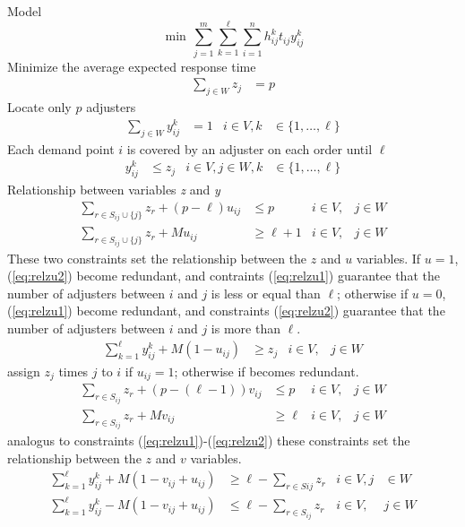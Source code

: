 Model
\begin{equation}
  \min \, \sum_{j=1}^{m}{
    \sum_{k=1}^{\ell}{
      \sum_{i=1}^{n}{
        h_{ij}^{k}t_{ij}y_{ij}^{k}
      }
    }
  }
\end{equation}
Minimize the average expected response time
\begin{align}
  \sum_{j \in W}{z_j}
  & = p
\end{align}
Locate only $p$ adjusters
\begin{align}
  \sum_{j \in W}{y_{ij}^{k}}
  & = 1
  & i \in V, k
  &\in \{1,\ldots,\ell\}
\end{align}
Each demand point $i$ is covered by an adjuster on each order until $\ell$
\begin{align}
  y_{ij}^{k}
  & \leq z_j
  & i \in V,j \in W, k
  &\in \{1,\ldots,\ell\}
\end{align}
Relationship between variables \textit{z} and \textit{y}
\begin{align}
  \label{eq:relzu1}
  \sum_{r \in S_{ij}\cup\{j\}}{
    z_{r}
  }
  + (p-\ell) u_{ij}
  & \leq p
  & i \in V,
  & j \in W 
  \\
  \label{eq:relzu2}
  \sum_{r \in S_{ij}\cup\{j\}}{
    z_{r}
  }
  + M u_{ij}
  & \geq \ell+1
  & i \in V,
  & j \in W
\end{align}
These two constraints
set the relationship
between the $z$ and $u$ variables.
If $u = 1$,
(\ref{eq:relzu2}) become redundant,
and contraints (\ref{eq:relzu1}) guarantee
that the number of adjusters between $i$ and $j$
is less or equal than $\ell$;
otherwise
if $u = 0$,
(\ref{eq:relzu1}) become redundant,
and constraints (\ref{eq:relzu2}) guarantee
that the number of adjusters between $i$ and $j$
is more than $\ell$.
\begin{align}
  \sum_{k = 1}^{\ell}{
    y_{ij}^{k}
  }
  + M (1 - u_{ij})
  & \geq z_j
  & i \in V,
  & j \in W
\end{align}
assign $z_j$ times $j$ to $i$ if $u_{ij}=1$;
otherwise
if becomes redundant.
\begin{align}
  \sum_{r \in S_{ij}}{
    z_{r}
  }
  + (p-(\ell-1)) v_{ij}
  & \leq p
  & i \in V,
  & j \in W
  \\
  \sum_{r \in S_{ij}}{
    z_{r}
  }
  + M v_{ij}
  & \geq \ell
  & i \in V,
  & j \in W
\end{align}
analogus to constraints (\ref{eq:relzu1})-(\ref{eq:relzu2})
these constraints
set the relationship
between the $z$ and $v$ variables.
\begin{align}
  \sum_{k=1}^{\ell}{
    y_{ij}^{k}
  }
  + M (1 - v_{ij} + u_{ij})
  & \geq \ell
  - \sum_{r \in S{ij}}{
    z_{r}
  } 
  &  i \in V, j 
  & \in W
  \\
  \sum_{k=1}^{\ell}{
    y_{ij}^{k}
  }
  - M (1 - v_{ij} + u_{ij})
  & \leq \ell 
  - \sum_{r \in S_{ij}}{
    z_{r}
  }
  & i \in V,
  & j \in W
\end{align}
